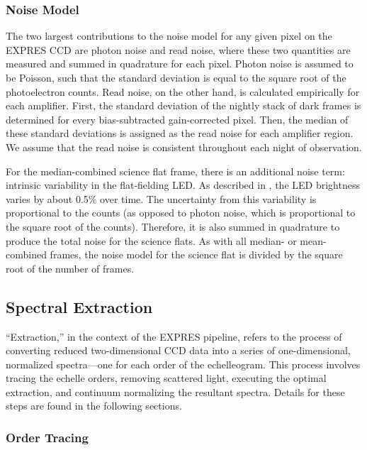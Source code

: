 \subsubsection{Noise Model}\label{noise-model}

The two largest contributions to the noise model for any given pixel on the EXPRES CCD are photon noise and read noise, where these two quantities are measured and summed in quadrature for each pixel. Photon noise is assumed to be Poisson, such that the standard deviation is equal to the square root of the photoelectron counts. Read noise, on the other hand, is calculated empirically for each amplifier. First, the standard deviation of the nightly stack of dark frames is determined for every bias-subtracted gain-corrected pixel. Then, the median of these standard deviations is assigned as the read noise for each amplifier region. We assume that the read noise is consistent throughout each night of observation.

For the median-combined science flat frame, there is an additional noise term: intrinsic variability in the flat-fielding LED. As described in \citet{blackman_performance_2020}, the LED brightness varies by about 0.5\% over time. The uncertainty from this variability is proportional to the counts (as opposed to photon noise, which is proportional to the square root of the counts).  Therefore, it is also summed in quadrature to produce the total noise for the science flats. As with all median- or mean-combined frames, the noise model for the science flat is divided by the square root of the number of frames.

\subsection{Spectral Extraction}\label{spectral-extraction}

``Extraction,'' in the context of the EXPRES pipeline, refers to the process of converting reduced two-dimensional CCD data into a series of one-dimensional, normalized spectra---one for each order of the echelleogram. This process involves tracing the echelle orders, removing scattered light, executing the optimal extraction, and continuum normalizing the resultant spectra. Details for these steps are found in the following sections.

\subsubsection{Order Tracing}\label{order-tracing}

